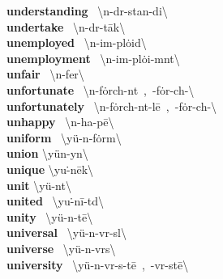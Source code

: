 \documentclass[10pt,a4paper]{article}
\begin{document}
\begin{multicols}{2}
\textbf{ understanding }\quad \ \textbackslash \textsecstress \textschwa n-d\textschwa r-\textprimstress stan-di\engma \textbackslash \\
\textbf{ undertake }\quad \ \textbackslash \textsecstress \textschwa n-d\textschwa r-\textprimstress t\={a}k\textbackslash \\
\textbf{ unemployed }\quad \ \textbackslash \textsecstress \textschwa n-im-\textprimstress pl\.{o}id\textbackslash \\
\textbf{ unemployment }\quad \ \textbackslash \textsecstress \textschwa n-im-\textprimstress pl\.{o}i-m\textschwa nt\textbackslash \\
\textbf{ unfair }\quad \ \textbackslash \textsecstress \textschwa n-\textprimstress fer\textbackslash \\
\textbf{ unfortunate }\quad \ \textbackslash \textsecstress \textschwa n-\textprimstress f\.{o}rch-n\textschwa t\ ,\ -\textprimstress f\.{o}r-ch\textschwa -\textbackslash \\
\textbf{ unfortunately }\quad \ \textbackslash \textsecstress \textschwa n-\textprimstress f\.{o}rch-n\textschwa t-l\={e}\ ,\ -\textprimstress f\.{o}r-ch\textschwa -\textbackslash \\
\textbf{ unhappy }\quad \ \textbackslash \textsecstress \textschwa n-\textprimstress ha-p\={e}\textbackslash \\
\textbf{ uniform }\quad \ \textbackslash \textprimstress y\"{u}-n\textschwa -\textsecstress f\.{o}rm\textbackslash \\
\textbf{ union }\quad \textbackslash \textprimstress y\"{u}n-y\textschwa n\textbackslash \\
\textbf{ unique }\quad \textbackslash yu\. -\textprimstress n\={e}k\textbackslash \\
\textbf{ unit }\quad \textbackslash \textprimstress y\"{u}-n\textschwa t\textbackslash \\
\textbf{ united }\quad \ \textbackslash yu\. -\textprimstress n\={i}-t\textschwa d\textbackslash \\
\textbf{ unity }\quad \ \textbackslash \textprimstress y\"{u}-n\textschwa -t\={e}\textbackslash \\
\textbf{ universal }\quad \ \textbackslash \textsecstress y\"{u}-n\textschwa -\textprimstress v\textschwa r-s\textschwa l\textbackslash \\
\textbf{ universe }\quad \ \textbackslash \textprimstress y\"{u}-n\textschwa -\textsecstress v\textschwa rs\textbackslash \\
\textbf{ university }\quad \ \textbackslash \textsecstress y\"{u}-n\textschwa -\textprimstress v\textschwa r-s\textschwa -t\={e}\ ,\ -\textprimstress v\textschwa r-st\={e}\textbackslash \\

\end{multicols}
\end{document}
